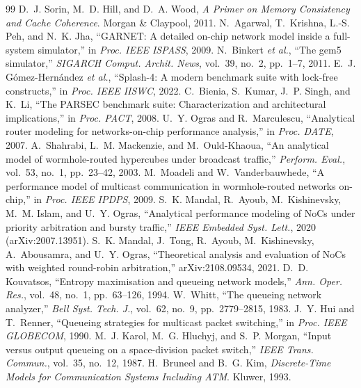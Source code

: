 \documentclass[conference]{IEEEtran}
\begin{document}
\begin{thebibliography}{99}
\footnotesize
{} D.~J. Sorin, M.~D. Hill, and D.~A. Wood, \emph{A Primer on Memory Consistency and Cache Coherence}. Morgan \& Claypool, 2011.
 N.~Agarwal, T.~Krishna, L.-S. Peh, and N.~K. Jha, ``GARNET: A detailed on-chip network model inside a full-system simulator,'' in \emph{Proc. IEEE ISPASS}, 2009.
 N.~Binkert \emph{et al.}, ``The gem5 simulator,'' \emph{SIGARCH Comput. Archit. News}, vol.~39, no.~2, pp.~1--7, 2011.
 E.~J. G\'omez-Hern\'andez \emph{et al.}, ``Splash-4: A modern benchmark suite with lock-free constructs,'' in \emph{Proc. IEEE IISWC}, 2022.
 C.~Bienia, S.~Kumar, J.~P. Singh, and K.~Li, ``The PARSEC benchmark suite: Characterization and architectural implications,'' in \emph{Proc. PACT}, 2008.
 U.~Y. Ogras and R.~Marculescu, ``Analytical router modeling for networks-on-chip performance analysis,'' in \emph{Proc. DATE}, 2007.
 A.~Shahrabi, L.~M. Mackenzie, and M.~Ould-Khaoua, ``An analytical model of wormhole-routed hypercubes under broadcast traffic,'' \emph{Perform. Eval.}, vol.~53, no.~1, pp.~23--42, 2003.
 M.~Moadeli and W.~Vanderbauwhede, ``A performance model of multicast communication in wormhole-routed networks on-chip,'' in \emph{Proc. IEEE IPDPS}, 2009.
 S.~K. Mandal, R.~Ayoub, M.~Kishinevsky, M.~M. Islam, and U.~Y. Ogras, ``Analytical performance modeling of NoCs under priority arbitration and bursty traffic,'' \emph{IEEE Embedded Syst. Lett.}, 2020 (arXiv:2007.13951).
 S.~K. Mandal, J.~Tong, R.~Ayoub, M.~Kishinevsky, A.~Abousamra, and U.~Y. Ogras, ``Theoretical analysis and evaluation of NoCs with weighted round-robin arbitration,'' arXiv:2108.09534, 2021.
 D.~D. Kouvatsos, ``Entropy maximisation and queueing network models,'' \emph{Ann. Oper. Res.}, vol.~48, no.~1, pp.~63--126, 1994.
 W.~Whitt, ``The queueing network analyzer,'' \emph{Bell Syst. Tech. J.}, vol.~62, no.~9, pp.~2779--2815, 1983.
 J.~Y. Hui and T.~Renner, ``Queueing strategies for multicast packet switching,'' in \emph{Proc. IEEE GLOBECOM}, 1990.
 M.~J. Karol, M.~G. Hluchyj, and S.~P. Morgan, ``Input versus output queueing on a space-division packet switch,'' \emph{IEEE Trans. Commun.}, vol.~35, no.~12, 1987.
 H.~Bruneel and B.~G. Kim, \emph{Discrete-Time Models for Communication Systems Including ATM}. Kluwer, 1993.
\end{thebibliography}
\end{document}
